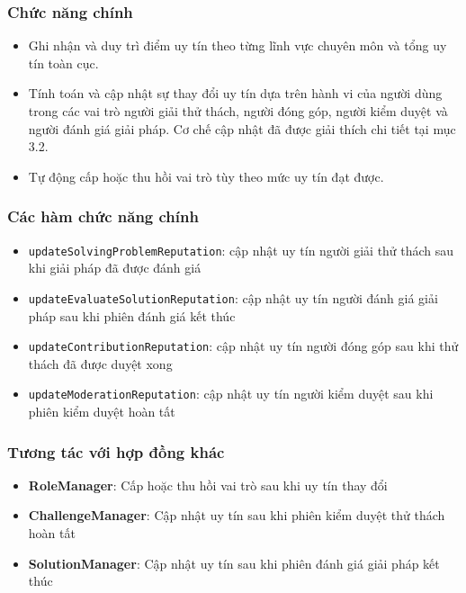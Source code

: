 \subsubsection{Chức năng chính}

\begin{itemize}
  \item Ghi nhận và duy trì điểm uy tín theo từng lĩnh vực chuyên môn và tổng uy tín toàn cục.
  \item Tính toán và cập nhật sự thay đổi uy tín dựa trên hành vi của người dùng trong các vai trò người giải thử thách, người đóng góp, người kiểm duyệt và người đánh giá giải pháp. Cơ chế cập nhật đã được giải thích chi tiết tại mục 3.2.
  \item Tự động cấp hoặc thu hồi vai trò tùy theo mức uy tín đạt được.
\end{itemize}

\subsubsection{Các hàm chức năng chính}

\begin{itemize}
  \item \texttt{updateSolvingProblemReputation}: cập nhật uy tín người giải thử thách sau khi giải pháp đã được đánh giá
  \item \texttt{updateEvaluateSolutionReputation}: cập nhật uy tín người đánh giá giải pháp sau khi phiên đánh giá kết thúc
  \item \texttt{updateContributionReputation}: cập nhật uy tín người đóng góp sau khi thử thách đã được duyệt xong
  \item \texttt{updateModerationReputation}: cập nhật uy tín người kiểm duyệt sau khi phiên kiểm duyệt hoàn tất
\end{itemize}

\subsubsection{Tương tác với hợp đồng khác}

\begin{itemize}
  \item \textbf{RoleManager}: Cấp hoặc thu hồi vai trò sau khi uy tín thay đổi
  \item \textbf{ChallengeManager}: Cập nhật uy tín sau khi phiên kiểm duyệt thử thách hoàn tất
  \item \textbf{SolutionManager}: Cập nhật uy tín sau khi phiên đánh giá giải pháp kết thúc
\end{itemize}
